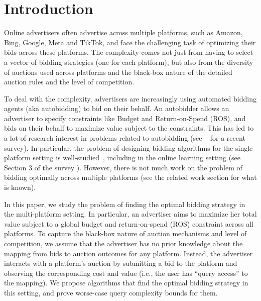 \section{Introduction}
Online advertisers often advertise across multiple platforms, such as Amazon, Bing, Google, Meta and TikTok, and face the challenging task of optimizing their bids across these platforms. The complexity comes not just from having to select a vector of bidding strategies (one for each platform), but also from the diversity of auctions used across platforms and the black-box nature of the detailed auction rules and the level of competition. 

To deal with the complexity, advertisers are increasingly using automated bidding agents (aka autobidding) to bid on their behalf. An autobidder allows an advertiser to specify constraints like Budget and Return-on-Spend (ROS), and bids on their behalf to maximize value subject to the constraints. 
This has led to a lot of research interest in problems related to autobidding (see ~\citet{AutobiddingSurvey24} for a recent survey). In particular, the problem of designing bidding algorithms for the single platform setting is well-studied~\cite{ABM19}, including in the online learning setting (see Section 3 of the survey \cite{AutobiddingSurvey24}). However, there is not much work on the problem of bidding optimally across multiple platforms (see the related work section for what is known).

In this paper, we study the problem of finding the optimal bidding strategy in the multi-platform setting. In particular, an advertiser aims to maximize her total value subject to a global budget and return-on-spend (ROS) constraint across all platforms. %
To capture the black-box nature of auction mechanisms and level of competition, we assume that the advertiser has no prior knowledge about the mapping from bids to auction outcomes for any platform. Instead, the advertiser interacts with a platform's auction by submitting a bid to the platform and observing the corresponding cost and value (i.e., the user has ``query access'' to the mapping). We propose algorithms that find the optimal bidding strategy in this setting, %
and prove worse-case query complexity bounds for them. 

